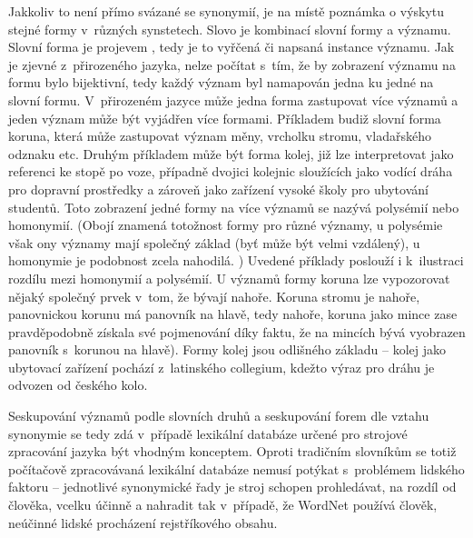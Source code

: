 \documentclass[a4paper,11pt,openany,twoside]{book}
\newcommand\ex{\textsf}
\begin{document}
					Jakkoliv to není přímo svázané se synonymií, je na místě poznámka o výskytu stejné formy v~různých synstetech. Slovo je kombinací slovní formy a významu. Slovní forma je projevem , tedy je to vyřčená či napsaná instance významu. Jak je zjevné z~přirozeného jazyka, nelze počítat s~tím, že by zobrazení významu na formu bylo bijektivní, tedy každý význam byl namapován jedna ku jedné na slovní formu. V~přirozeném jazyce může jedna forma zastupovat více významů a jeden význam může být vyjádřen více formami. Příkladem budiž slovní forma \ex{koruna}, která může zastupovat význam měny, vrcholku stromu, vladařského odznaku etc. Druhým příkladem může být forma \ex{kolej}, již lze interpretovat jako referenci ke stopě po voze, případně dvojici kolejnic sloužících jako vodící dráha pro dopravní prostředky a zároveň jako zařízení vysoké školy pro ubytování studentů. \parencite{Havranek1989} Toto zobrazení jedné formy na více významů se nazývá polysémií nebo homonymií. (Obojí znamená totožnost formy pro různé významy, u polysémie však ony významy mají společný základ (byť může být velmi vzdálený), u homonymie je podobnost zcela nahodilá. \parencite{klepousniotou2002processing}) Uvedené příklady poslouží i k~ilustraci rozdílu mezi homonymií a polysémií. U významů formy \ex{koruna} lze vypozorovat nějaký společný prvek v~tom, že bývají nahoře. \ex{Koruna} stromu je nahoře, panovnickou \ex{korunu} má panovník na hlavě, tedy nahoře, \ex{koruna} jako mince zase pravděpodobně získala své pojmenování díky faktu, že na mincích bývá vyobrazen panovník s~\ex{korunou} na hlavě). Formy \ex{kolej} jsou odlišného základu -- \ex{kolej} jako ubytovací zařízení pochází z~latinského \ex{collegium}, kdežto výraz pro dráhu je odvozen od českého \ex{kolo}. \parencite{Rejzek2012}

					Seskupování významů podle slovních druhů a seskupování forem dle vztahu synonymie se tedy zdá v~případě lexikální databáze určené pro strojové zpracování jazyka být vhodným konceptem. Oproti tradičním slovníkům se totiž počítačově zpracovávaná lexikální databáze nemusí potýkat s~problémem lidského faktoru -- jednotlivé synonymické řady je stroj schopen prohledávat, na rozdíl od člověka, vcelku účinně a nahradit tak v~případě, že WordNet používá člověk, neúčinné lidské procházení rejstříkového obsahu.

					
\end{document}
